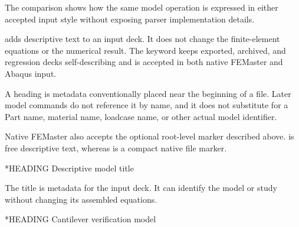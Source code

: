 The comparison shows how the same model operation is expressed in either accepted input style without exposing parser implementation details.


 adds descriptive text to an input deck. It does not change the finite-element equations or the numerical result. The keyword keeps exported, archived, and regression decks self-describing and is accepted in both native FEMaster and Abaqus input.

A heading is metadata conventionally placed near the beginning of a file. Later model commands do not reference it by name, and it does not substitute for a Part name, material name, loadcase name, or other actual model identifier.

Native FEMaster also accepts the optional root-level  marker described above.  is free descriptive text, whereas  is a compact native file marker.

\syntaxheading

\begin{syntax}
*HEADING
Descriptive model title
\end{syntax}

The title is metadata for the input deck. It can identify the model or study without changing its assembled equations.

\exampleheading

\begin{inputdeck}
*HEADING
Cantilever verification model
\end{inputdeck}
